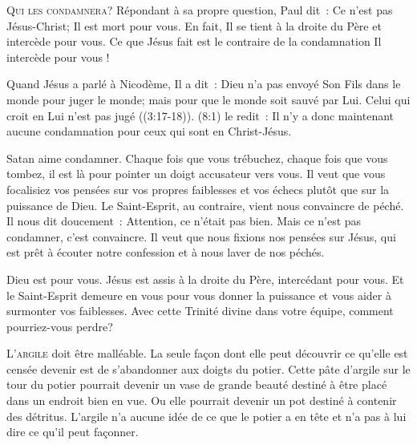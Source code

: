 \lettrine[ante=\og]{Q}{ui les condamnera?} \fg{}
 Répondant à sa propre question, Paul dit~: 
 \og Ce n'est pas Jésus-Christ; Il est mort pour vous.
 En fait, Il se tient à la droite du Père et intercède pour vous. \fg{}
 Ce que Jésus fait est le contraire de la condamnation
 \ocadr Il intercède pour vous !

Quand Jésus a parlé à Nicodème, Il a dit~: 
 \og Dieu n'a pas envoyé Son Fils dans le monde pour juger le monde;
 mais pour que le monde soit sauvé par Lui. Celui qui croit en Lui
 n'est pas jugé \fg{} ((3:17-18)).
 (8:1) le redit~: 
 \og Il n'y a donc maintenant aucune condamnation
 pour ceux qui sont en Christ-Jésus. \fg{}


Satan aime condamner. Chaque fois que vous trébuchez,
 chaque fois que vous tombez, il est là pour pointer un doigt accusateur
 vers vous. Il veut que vous focalisiez vos pensées sur vos propres faiblesses
 et vos échecs plutôt que sur la puissance de Dieu.
 Le Saint-Esprit, au contraire, vient nous convaincre de péché.
 Il nous dit doucement~: 
 \og Attention, ce n'était pas bien. \fg{}
 Mais ce n'est pas condamner, c'est convaincre.
 Il veut que nous fixions nos pensées sur Jésus,
 qui est prêt à écouter notre confession et à nous laver de nos péchés.

Dieu est pour vous. Jésus est assis à la droite du Père,
 intercédant pour vous. Et le Saint-Esprit demeure en vous
 pour vous donner la puissance et vous aider à surmonter vos faiblesses.
 Avec cette Trinité divine dans 
 votre équipe, comment pourriez-vous perdre?

\dvrule






\lettrine{L}{'argile} doit être malléable.
 La seule façon dont elle peut découvrir ce qu'elle est censée devenir
 est de s'abandonner aux doigts du potier.
 Cette pâte d'argile sur le tour du potier pourrait devenir
 un vase de grande beauté destiné à être placé dans un endroit
 bien en vue. Ou elle pourrait devenir un pot destiné à contenir
 des détritus. L'argile n'a aucune idée de ce que le potier
 a en tête et n'a pas à lui dire ce qu'il peut façonner.

